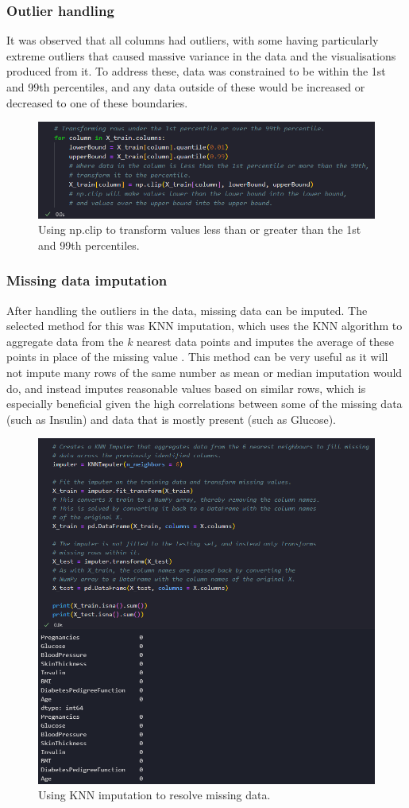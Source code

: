 \documentclass[12pt]{report}
\begin{document}
\subsubsection{Outlier handling}
It was observed that all columns had outliers, with some having particularly extreme outliers that caused massive variance in the data and 
the visualisations produced from it. To address these, data was constrained to be within the 1st and 99th percentiles, and any data outside 
of these would be increased or decreased to one of these boundaries.

\begin{figure}[H]
    \centering
    \includegraphics[width=\linewidth]{Preprocessing/OutlierConstraining.png}
    \caption{Using np.clip to transform values less than or greater than the 1st and 99th percentiles.}
    \label{fig:OutlierConstraining}
\end{figure}

\subsubsection{Missing data imputation}
After handling the outliers in the data, missing data can be imputed. The selected method for this was KNN imputation,
which uses the KNN algorithm to aggregate data from the $k$ nearest data points and imputes the average of these points 
in place of the missing value \autocite{trainindata_knn_2024}. This method can be very useful as it will not impute many rows 
of the same number as mean or median imputation would do, and instead imputes reasonable values based on similar rows,
which is especially beneficial given the high correlations between some of the missing data (such as Insulin) and data 
that is mostly present (such as Glucose).

\begin{figure}[H]
    \centering
    \includegraphics[width=.6\linewidth]{Preprocessing/KNNImputation.png}
    \caption{Using KNN imputation to resolve missing data.}
    \label{fig:KNNImputation}
\end{figure}
\end{document}
